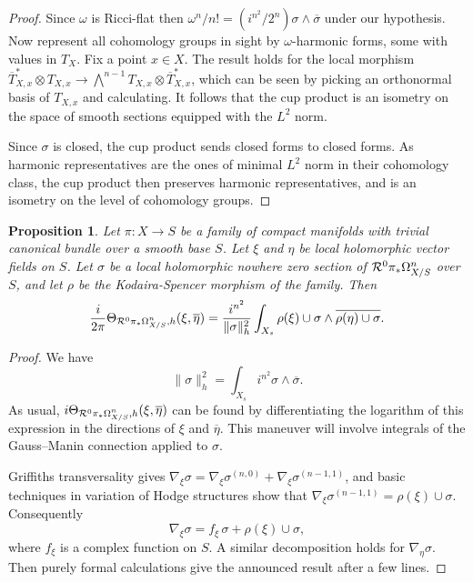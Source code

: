 \documentclass[11pt,a4paper]{amsart}
\newtheorem{prop}[theo]{Proposition}
\theoremstyle{definition}
\theoremstyle{remark}
\def\rel{\CR^0\pi_*\smash{\Omega_{X/S}^n}}
\def\CR{\mathcal{R}}
\begin{document}
\begin{proof}
  Since $\omega$ is Ricci-flat then $\omega^n/n! = (i^{n^2}/2^n)
  \sigma \wedge \overline{\sigma}$ under our hypothesis. Now represent
  all cohomology groups in sight by $\omega$-harmonic forms, some
  with values in $T_X$. Fix a point $x \in X$. The result holds
  for the local morphism $\overline{T}^*_{X,x} \otimes T_{X,x} \to
  \bigwedge^{n-1} T_{X,x} \otimes \overline T_{X,x}^*$, which can be
  seen by picking an orthonormal basis of $T_{X,x}$ and calculating. It
  follows that the cup product is an isometry on the space of smooth
  sections equipped with the $L^2$ norm.

Since $\sigma$ is closed, the cup product sends closed forms to closed
forms. As harmonic representatives are the ones of minimal $L^2$ norm
in their cohomology class, the cup product then preserves harmonic
representatives, and is an isometry on the level of cohomology groups.
\end{proof}



\begin{prop}
\label{proptw}
Let $\pi : X \to S$ be a family of compact manifolds with trivial
canonical bundle over a smooth base $S$. Let $\xi$ and $\eta$ be
local holomorphic vector fields on $S$. Let $\sigma$ be a local
holomorphic nowhere zero section of $\rel$ over $S$, and let $\rho$
be the Kodaira-Spencer morphism of the family. Then
$$
\frac{i}{2\pi} \Theta_{\rel,h}(\xi, \overline \eta) =
\frac{i^{n^2}}{\| \sigma \|_{h}^2}
\int_{X_s} \rho(\xi) \cup \sigma
\wedge \overline{\rho(\eta) \cup \sigma}.
$$
\end{prop}

\begin{proof}
  We have
$$
\| \sigma \|_{h}^2 = \int_{X_s} i^{n^2} \sigma \wedge \overline \sigma.
$$
As usual, $i\Theta_{\rel,h}(\xi,\overline \eta)$ can be found by
differentiating the logarithm of this expression in the directions
of $\xi$ and $\overline \eta$. This maneuver will involve integrals
of the Gauss--Manin connection applied to $\sigma$.

  Griffiths transversality gives $\nabla_\xi \sigma = \nabla_\xi
  \sigma^{(n,0)} + \nabla_\xi \sigma^{(n-1,1)}$, and basic
  techniques in variation of Hodge structures show that $\nabla_\xi
  \sigma^{(n-1,1)} = \rho(\xi) \cup \sigma$. Consequently
$$
  \nabla_\xi \sigma =
  f_\xi \, \sigma + \rho(\xi) \cup \sigma,
$$
where $f_\xi$ is a complex function on $S$. A similar decomposition
holds for $\nabla_\eta \sigma$. Then purely formal calculations give the
announced result after a few lines.
\end{proof}
\end{document}

